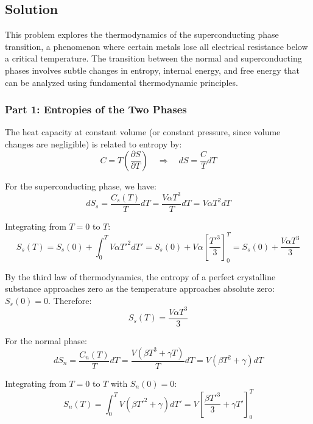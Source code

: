 \documentclass[10pt,twocoloumn]{article}
\begin{document}
\subsection*{Solution}

This problem explores the thermodynamics of the superconducting phase transition, a phenomenon where certain metals lose all electrical resistance below a critical temperature. The transition between the normal and superconducting phases involves subtle changes in entropy, internal energy, and free energy that can be analyzed using fundamental thermodynamic principles.

\subsubsection*{Part 1: Entropies of the Two Phases}

The heat capacity at constant volume (or constant pressure, since volume changes are negligible) is related to entropy by:
\begin{equation}C = T\left(\frac{\partial S}{\partial T}\right) \quad \Rightarrow \quad dS = \frac{C}{T}dT\end{equation}

For the superconducting phase, we have:
\begin{equation}dS_s = \frac{C_s(T)}{T}dT = \frac{V\alpha T^3}{T}dT = V\alpha T^2 dT\end{equation}

Integrating from $T=0$ to $T$:
\begin{equation}S_s(T) = S_s(0) + \int_0^T V\alpha T'^2 dT' = S_s(0) + V\alpha \left[\frac{T'^3}{3}\right]_0^T = S_s(0) + \frac{V\alpha T^3}{3}\end{equation}

By the third law of thermodynamics, the entropy of a perfect crystalline substance approaches zero as the temperature approaches absolute zero: $S_s(0) = 0$. Therefore:
\begin{equation}\boxed{S_s(T) = \frac{V\alpha T^3}{3}}\end{equation}

For the normal phase:
\begin{equation}dS_n = \frac{C_n(T)}{T}dT = \frac{V(\beta T^3 + \gamma T)}{T}dT = V(\beta T^2 + \gamma)dT\end{equation}

Integrating from $T=0$ to $T$ with $S_n(0) = 0$:
\begin{equation}S_n(T) = \int_0^T V(\beta T'^2 + \gamma)dT' = V\left[\frac{\beta T'^3}{3} + \gamma T'\right]_0^T\end{equation}
\end{document}
